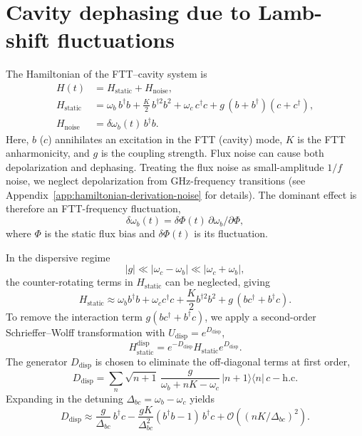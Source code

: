 \section{Cavity dephasing due to Lamb-shift fluctuations}

The Hamiltonian of the FTT--cavity system is
\begin{align}
H(t) &= H_{\mathrm{static}} + H_{\mathrm{noise}}, \label{H}\\
H_{\mathrm{static}} &=
\omega_b\, b^\dagger b
+ \frac{K}{2}\, b^{\dagger 2} b^{2}
+ \omega_c\, c^\dagger c
+ g\,(b+b^\dagger)(c+c^\dagger), \label{Hstatic}\\
H_{\mathrm{noise}} &= \delta\omega_b(t)\, b^\dagger b .
\end{align}
Here, $b$ ($c$) annihilates an excitation in the FTT (cavity) mode, $K$ is the FTT anharmonicity, and $g$ is the coupling strength. Flux noise can cause both depolarization and dephasing. Treating the flux noise as small-amplitude $1/f$ noise, we neglect depolarization from GHz-frequency transitions (see Appendix~\ref{app:hamiltonian-derivation-noise} for details). The dominant effect is therefore an FTT-frequency fluctuation,
\begin{equation}
\delta\omega_b(t)=\delta\Phi(t)\,\partial\omega_b/\partial\Phi,
\end{equation}
where $\Phi$ is the static flux bias and $\delta\Phi(t)$ is its fluctuation.

In the dispersive regime
\begin{equation}
|g| \ll |\omega_c-\omega_b| \ll |\omega_c+\omega_b|,
\end{equation}
the counter-rotating terms in $H_{\mathrm{static}}$ can be neglected, giving
\begin{equation}
H_{\mathrm{static}}
\approx
\omega_b b^\dagger b + \omega_c c^\dagger c + \frac{K}{2} b^{\dagger 2} b^2
+ g\,(bc^\dagger + b^\dagger c).
\end{equation}
To remove the interaction term $g(bc^\dagger + b^\dagger c)$, we apply a second-order Schrieffer--Wolff transformation with $U_{\mathrm{disp}}=e^{D_{\mathrm{disp}}}$,
\begin{equation}
H_{\mathrm{static}}^{\mathrm{disp}}
=
e^{-D_{\mathrm{disp}}} H_{\mathrm{static}} e^{D_{\mathrm{disp}}}.
\end{equation}
The generator $D_{\mathrm{disp}}$ is chosen to eliminate the off-diagonal terms at first order,
\begin{equation}
\label{Ddisp}
D_{\mathrm{disp}}=
\sum_n \sqrt{n+1}\,
\frac{g}{\omega_b+nK-\omega_c}\,
|n+1\rangle\langle n|\,c
-\mathrm{h.c.}
\end{equation}
Expanding in the detuning $\Delta_{bc}=\omega_b-\omega_c$ yields
\begin{equation}
D_{\mathrm{disp}}
\approx
\frac{g}{\Delta_{bc}}\,b^\dagger c
-\frac{gK}{\Delta_{bc}^2}(b^\dagger b-1)\,b^\dagger c
+\mathcal{O}\!\left((nK/\Delta_{bc})^2\right).
\end{equation}


